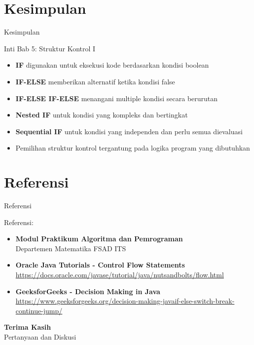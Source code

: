 \documentclass{beamer}
\begin{document}
\section{Kesimpulan}
\begin{frame}{Kesimpulan}
  \begin{alertblock}{Inti Bab 5: Struktur Kontrol I}
    \begin{itemize}
      \item \textbf{IF} digunakan untuk eksekusi kode berdasarkan kondisi boolean
      \item \textbf{IF-ELSE} memberikan alternatif ketika kondisi false
      \item \textbf{IF-ELSE IF-ELSE} menangani multiple kondisi secara berurutan
      \item \textbf{Nested IF} untuk kondisi yang kompleks dan bertingkat
      \item \textbf{Sequential IF} untuk kondisi yang independen dan perlu semua dievaluasi
      \item Pemilihan struktur kontrol tergantung pada logika program yang dibutuhkan
    \end{itemize}
  \end{alertblock}
\end{frame}

\section{Referensi}
\begin{frame}{Referensi}
  \begin{block}{Referensi:}
    \begin{itemize}
      \item \textbf{Modul Praktikum Algoritma dan Pemrograman}\\
            Departemen Matematika FSAD ITS
      \item \textbf{Oracle Java Tutorials - Control Flow Statements}\\
            \url{https://docs.oracle.com/javase/tutorial/java/nutsandbolts/flow.html}
      \item \textbf{GeeksforGeeks - Decision Making in Java}\\
            \url{https://www.geeksforgeeks.org/decision-making-javaif-else-switch-break-continue-jump/}
    \end{itemize}
  \end{block}
\end{frame}

\begin{frame}[standout]
  \Huge \textbf{Terima Kasih} \\[1.5em]
  \Large Pertanyaan dan Diskusi
\end{frame}
\end{document}
